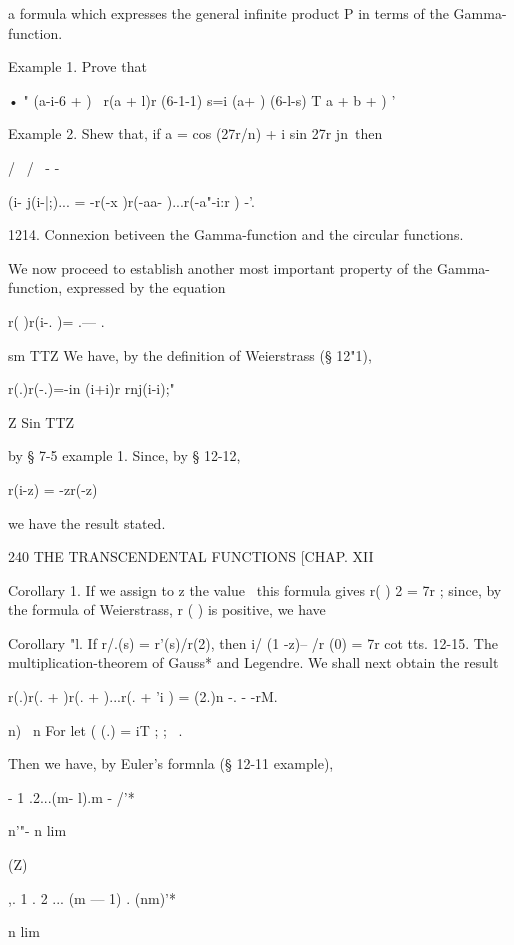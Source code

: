 a formula which expresses the general infinite product P in terms of
the Gamma-function.

Example 1. Prove that

• " (a-i-6 + ) \ r(a + l)r (6-1-1) s=i (a+ ) (6-l-s) T a + b + ) '

Example 2. Shew that, if a = cos (27r/n) + i sin 27r jn\ then

/ \ / \ - -

 (i- j(i-|;)... = -r(-x )r(-aa- )...r(-a"-i:r ) -'.

1214. Connexion betiveen the Gamma-function and the circular
functions.

We now proceed to establish another most important property of the
Gamma-function, expressed by the equation

r( )r(i-. )= .— .

sm TTZ We have, by the definition of Weierstrass (§ 12"1),

r(.)r(-.)=-in (i+i)r rnj(i-i);"



Z Sin TTZ

by § 7-5 example 1. Since, by § 12-12,

r(i-z) = -zr(-z)

we have the result stated.



240 THE TRANSCENDENTAL FUNCTIONS [CHAP. XII

Corollary 1. If we assign to z the value \, this formula gives r( ) 2
= 7r ; since, by the formula of Weierstrass, r ( ) is positive, we
have

Corollary "l. If r/.(s) = r'(s)/r(2), then i/ (1 -z)-- /r (0) = 7r cot
tts. 12-15. The multiplication-theorem of Gauss* and Legendre. We
shall next obtain the result

r(.)r(. + )r(. + )...r(. + 'i ) = (2.)n -. - -rM.



n) \ n For let ( (.) = iT ; ; \ .

Then we have, by Euler's formnla (§ 12-11 example),

 - 1 .2...(m- l).m - /'*



n'"- n lim



 (Z)



,. 1 . 2 ... (m — 1) . (nm)'*

n lim



